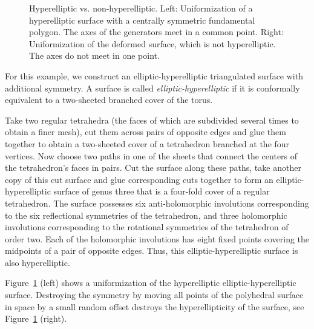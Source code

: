 \documentclass[Thesis]{subfiles}
\begin{document}
\begin{figure}
\centering
{}
\caption{Hyperelliptic vs. non-hyperelliptic. Left: Uniformization of a
  hyperelliptic surface with a centrally symmetric fundamental
  polygon. The axes of the generators meet in a common point. Right:
  Uniformization of the deformed surface, which is not hyperelliptic.
  The axes do not meet in one point.}
\label{fig:non-hyperelliptic}
\end{figure}

For this example, we construct an elliptic-hyperelliptic triangulated
surface with additional symmetry. A surface is called
\emph{elliptic-hyperelliptic} if it is conformally equivalent to a
two-sheeted branched cover of the torus.

Take two regular tetrahedra (the faces of which are subdivided several
times to obtain a finer mesh), cut them across pairs of opposite edges
and glue them together to obtain a two-sheeted cover of a tetrahedron
branched at the four vertices. Now choose two paths in one of the
sheets that connect the centers of the tetrahedron's faces in
pairs. Cut the surface along these paths, take another copy of this
cut surface and glue corresponding cuts together to form an
elliptic-hyperelliptic surface of genus three that is a four-fold
cover of a regular tetrahedron. The surface possesses six
anti-holomorphic involutions corresponding to the six reflectional
symmetries of the tetrahedron, and three holomorphic involutions
corresponding to the rotational symmetries of the tetrahedron of order
two. Each of the holomorphic involutions has eight fixed points
covering the midpoints of a pair of opposite edges. Thus, this
elliptic-hyperelliptic surface is also hyperelliptic.

Figure~\ref{fig:non-hyperelliptic} (left) shows a uniformization of
the hyperelliptic elliptic-hyperelliptic surface. Destroying the
symmetry by moving all points of the polyhedral surface in space by a
small random offset destroys the hyperellipticity of the surface, see
Figure~\ref{fig:non-hyperelliptic} (right).

\end{document}
